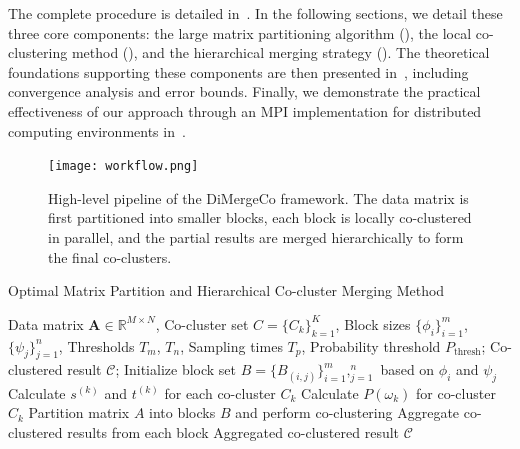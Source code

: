 \documentclass[journal]{IEEEtran}
\theoremstyle{definition}
\theoremstyle{remark} %
\begin{document}
The complete procedure is detailed in~. In the following sections, we detail these three core components: the large matrix partitioning algorithm (), the local co-clustering method (), and the hierarchical merging strategy (). The theoretical foundations supporting these components are then presented in~, including convergence analysis and error bounds. Finally, we demonstrate the practical effectiveness of our approach through an MPI implementation for distributed computing environments in~.

\begin{figure}[t]
    \centering
    \texttt{[image: workflow.png]} %
    \caption{High-level pipeline of the DiMergeCo framework. The data matrix is first partitioned into smaller blocks, each block is locally co-clustered in parallel, and the partial results are merged hierarchically to form the final co-clusters.}
    \label{fig:DiMergeCo-pipeline}
\end{figure}


\begin{algorithm}[!t]
    \caption{Optimal Matrix Partition and Hierarchical Co-cluster Merging Method}
    \begin{algorithmic}[1]
        \REQUIRE Data matrix $\mathbf{A} \in \mathbb{R}^{M \times N}$, Co-cluster set $C = \{C_k\}_{k=1}^K$, Block sizes $\{\phi_i\}_{i=1}^m$, $\{\psi_j\}_{j=1}^n$, Thresholds $T_m$, $T_n$, Sampling times $T_p$, Probability threshold $P_\text{thresh}$;
        \ENSURE Co-clustered result $\mathcal{C}$;
        \STATE Initialize block set $B = \{B_{(i,j)}\}_{i=1}^m,_{j=1}^n$ based on $\phi_i$ and $\psi_j$
        \STATE Calculate $s^{(k)}$ and $t^{(k)}$ for each co-cluster $C_k$
        \STATE Calculate $P(\omega_k)$ for co-cluster $C_k$
        \STATE Partition matrix $A$ into blocks $B$ and perform co-clustering
        \STATE Aggregate co-clustered results from each block
        \ENDIF
        \ENDFOR
        \RETURN Aggregated co-clustered result $\mathcal{C}$
    \end{algorithmic}
    \label{alg:method}
\end{algorithm}
\end{document}
